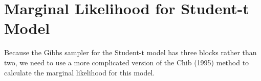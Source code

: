 \documentclass[12pt]{article}
\begin{document}

\section{Marginal Likelihood for Student-t Model}
Because the Gibbs sampler for the Student-t model has three blocks rather than two, we need to use a more complicated version of the Chib (1995) method to calculate the marginal likelihood for this model.
\end{document}
